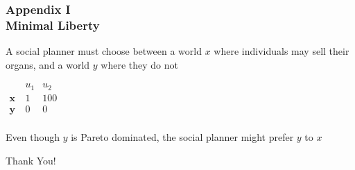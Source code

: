 \documentclass{beamer}
\begin{document}
\appendix
\begin{frame}
	\frametitle{Appendix I \\ Minimal Liberty}
	A social planner must choose between a world $x$ where individuals may sell their organs, and a world $y$ where they do not
	\begin{center}
		$
		\begin{array}{ccc}
		& u_1 & u_2 \\
		\mathbf{x} \ & 1 & 100 \\
		\mathbf{y} \ & 0 & 0 \\
		\end{array}
		$
	\end{center}
	Even though $y$ is Pareto dominated, the social planner might prefer $y$ to $x$ 
\end{frame}


\addtocounter{framenumber}{-1}
\begin{frame}[plain]
	\centering \color{darkred}\LARGE Thank You!
\end{frame}




\scriptsize{ }
\end{document}
